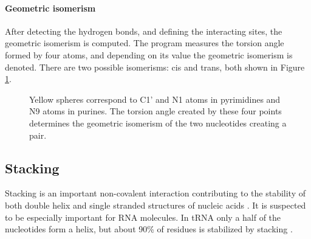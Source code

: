 \documentclass[12pt]{article}
\begin{document}
\newpage
\paragraph{Geometric isomerism}
After detecting the hydrogen bonds, and defining the interacting sites, the geometric isomerism is computed. The program measures the torsion angle formed by four atoms, and depending on its value the geometric isomerism is denoted. There are two possible isomerisms: cis and trans, both shown in Figure \ref{Conf}.

\begin{figure}[h!]
\begin{center}
\end{center}
\caption{Yellow spheres correspond to C1' and N1 atoms in pyrimidines and N9 atoms in purines. The torsion angle created by these four points determines the geometric isomerism of the two nucleotides creating a pair. }
\label{Conf}
\end{figure}

\subsection{Stacking}
Stacking is an important non-covalent interaction contributing to the stability of both double helix and single stranded structures of nucleic acids \cite{Hobza2008}. It is suspected to be especially important for RNA molecules. In tRNA only a half of the nucleotides form a helix, but about 90\% of residues is stabilized by stacking \cite{Bloomfield1999}. 
\end{document}
